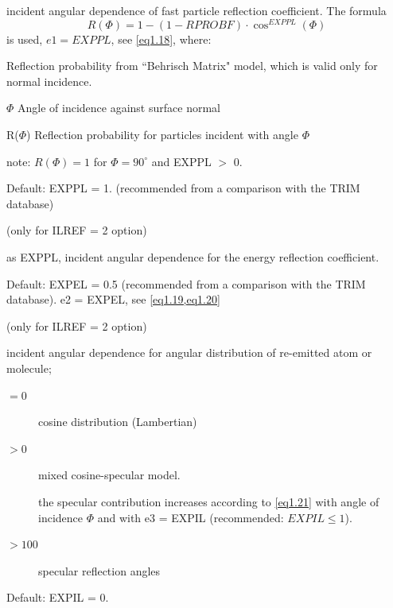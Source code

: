\begin{description}
        incident angular dependence of fast particle reflection coefficient.
        The formula
        \begin{displaymath}
          R( \Phi ) = 1 - (1 - RPROBF)	\cdot
          \cos^{EXPPL} (\Phi)
        \end{displaymath}
        is used, $e1 = EXPPL$, see \cref{eq1.18},
        where:
        \begin{description}
          \item[RPROBF] Reflection probability from ``Behrisch Matrix" model, which is
                valid only for normal incidence.
          \item {$\Phi$ \hfill} Angle of incidence against surface normal
          \item
                {R($\Phi$) \hfill} Reflection probability for particles incident with angle
                $\Phi$ 

                note: $R(\Phi) = 1$ for $\Phi = 90^{\circ}$ and EXPPL $>$  0.
        \end{description}
        Default: EXPPL = 1.
        (recommended from a comparison with the TRIM database)
  \item[EXPEL] (only for
        ILREF = 2 option) 

        as EXPPL, incident angular dependence for the energy reflection coefficient.

        Default: EXPEL = 0.5 (recommended from a comparison with the TRIM database).
        e2 = EXPEL, see \cref{eq1.19,eq1.20}
  \item[EXPIL] (only for ILREF = 2 option) 

        incident angular dependence for angular distribution of re-emitted atom or
        molecule; 

        \begin{description}
          \item[$= 0$] cosine distribution (Lambertian)
          \item[$> 0$]
                mixed cosine-specular model.

                the specular contribution increases according to \cref{eq1.21}
                with angle of incidence $\Phi$ and with
                e3 = EXPIL (recommended: $EXPIL \le 1$).
          \item[$> 100$] specular reflection angles
        \end{description}

        Default: EXPIL = 0.


\end{description}
